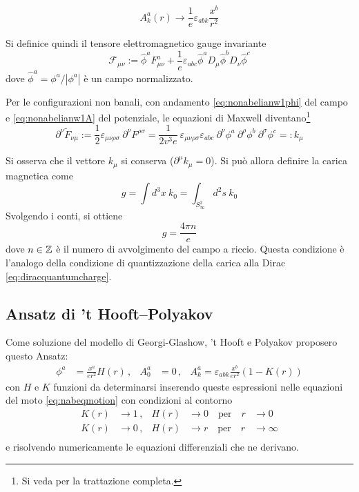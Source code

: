 \begin{equation}\label{eq:nonabelianw1A}
   A_k^a (r) \to \frac{1}{e} \varepsilon_{abk} \frac{x^b}{r^2}
\end{equation}

Si definice quindi il tensore elettromagnetico gauge invariante
\begin{equation}
   \mathcal{F}_{\mu\nu} := \hat{\phi}^a F^a_{\mu\nu}
          + \frac{1}{e} \varepsilon_{abc} \hat{\phi}^a D_\mu\hat{\phi}^b D_\nu \hat{\phi}^c
\end{equation}
dove $\hat{\phi}^a = \phi^a/|\phi^a|$ è un campo normalizzato.

Per le configurazioni non banali, con andamento \ref{eq:nonabelianw1phi} del campo
e \ref{eq:nonabelianw1A} del potenziale, le equazioni di Maxwell diventano\footnote{
   Si veda \cite{nakahara} per la trattazione completa.
}
$$
   \partial ^\nu \tilde{F}_{\nu\mu} :=
       \frac{1}{2} \varepsilon_{\mu\nu\rho\sigma} \: \partial ^\nu F^{\rho\sigma} =
       \frac{1}{2 v^3 e} \: \varepsilon_{\mu\nu\rho\sigma}\varepsilon_{abc} \:
       \partial^\nu \phi^a \: \partial^\rho \phi^b \: \partial^\sigma \phi^c
    =: k_\mu
$$

Si osserva che il vettore $k_\mu$ si conserva ($\partial ^\mu k_\mu = 0$).
Si può allora definire la carica magnetica come
$$
   g = \int d^3 x \: k_0 = \int_{S^2_\infty} d^2s \: k_0
$$
Svolgendo i conti, si ottiene
\begin{equation}\label{eq:nonabelianquantumcharge}
   g = \frac{4\pi n}{e}
\end{equation}
dove $n \in \mathbb{Z}$ è il numero di avvolgimento del campo a riccio.
Questa condizione è l'analogo della condizione di quantizzazione
della carica alla Dirac \ref{eq:diracquantumcharge}.
\subsection{Ansatz di ’t Hooft–Polyakov}
Come soluzione del modello di Georgi-Glashow, ’t Hooft e Polyakov proposero questo Ansatz:
\begin{equation}
   \begin{aligned}
      \phi^a & = \frac{x^a}{er^2}H(r) \, ,&
      A_0^a & = 0 \, ,&
      A_k^a = \varepsilon_{abk}\frac{x^b}{er^2}(1-K(r))
   \end{aligned}
\end{equation}
con $H$ e $K$ funzioni da determinarsi inserendo queste espressioni nelle equazioni
del moto \ref{eq:nabeqmotion} con condizioni al contorno
\begin{equation}
   \begin{aligned}
      K(r) &\to 1 \, ,& H(r) &\to 0 \quad \mathrm{per} \quad r & \to 0 \\
      K(r) &\to 0 \, ,& H(r) &\to r \quad \mathrm{per} \quad r & \to \infty \\
   \end{aligned}
\end{equation}
e risolvendo numericamente le equazioni differenziali che ne derivano.\\

